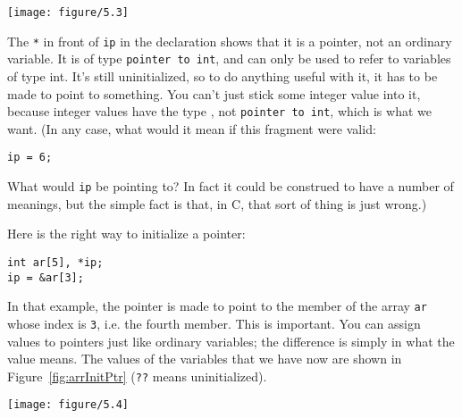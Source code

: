    \begin{figure*}[htb]\centering
     \texttt{[image: figure/5.3]}
     \caption*{Diagram showing an array with four elements
       (labelled 'ar[0]' to 'ar[4]') and a pointer called 'ip'
       which does not currently have any connection to the array.}
     \caption{\label{fig:arrPtr}An array and a pointer}
   \end{figure*}



   The \texttt{*} in front of \texttt{ip} in the declaration
    shows that it is a pointer, not an ordinary variable. It is of type
    \texttt{pointer to int}, and can only be used to refer to variables
    of type int. It's still uninitialized, so to do anything useful with it,
    it has to be made to point to something. You can't just stick some
    integer value into it, because integer values have the type
    \kint, not \texttt{pointer to int}, which is what we
    want.  (In any case, what would it mean if this fragment were valid:


   \begin{Verbatim}
ip = 6;
\end{Verbatim}

   What would \texttt{ip} be pointing to? In fact it could be
    construed to have a number of meanings, but the simple fact is that, in
    C, that sort of thing is just wrong.)


   Here is the right way to initialize a pointer:


   \begin{Verbatim}
int ar[5], *ip;
ip = &ar[3];
\end{Verbatim}

   In that example, the pointer is made to point to the member of the
    array \texttt{ar} whose index is \texttt{3}, i.e. the fourth
    member. This is important. You can assign values to pointers just like
    ordinary variables; the difference is simply in what the value means.
    The values of the variables that we have now
    are shown in Figure~\ref{fig:arrInitPtr} (\texttt{??} means uninitialized).


    \begin{figure*}\centering
      \texttt{[image: figure/5.4]}
      \caption*{Diagram showing an array with four elements
        (labelled 'ar[0]' to 'ar[4]') each of which has an undefined value,
        and a pointer called 'ip' which contains the address of 'ar[3]'.}
      \caption{\label{fig:arrInitPtr}Array and initialized pointer}
    \end{figure*}



